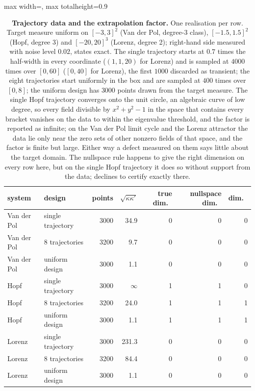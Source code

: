 \begin{table}[!htbp]
\centering\small
\begin{adjustbox}{max width=\textwidth, max totalheight=0.9\textheight}
\begin{tabular}{llrrrrr}
\toprule
system & design & points & $\sqrt{\kappa\kappa'}$ & true dim.\ & nullspace dim.\ & \symcert{} dim.\ \\
\midrule
Van der Pol & single trajectory & 3000 & 34.9 & 0 & 0 & 0 \\
Van der Pol & 8 trajectories & 3200 & 9.7 & 0 & 0 & 0 \\
Van der Pol & uniform design & 3000 & 1.1 & 0 & 0 & 0 \\
Hopf & single trajectory & 3000 & $\infty$ & 1 & 1 & 0 \\
Hopf & 8 trajectories & 3200 & 24.0 & 1 & 1 & 1 \\
Hopf & uniform design & 3000 & 1.1 & 1 & 1 & 1 \\
Lorenz & single trajectory & 3000 & 231.3 & 0 & 0 & 0 \\
Lorenz & 8 trajectories & 3200 & 84.4 & 0 & 0 & 0 \\
Lorenz & uniform design & 3000 & 1.1 & 0 & 0 & 0 \\
\bottomrule
\end{tabular}
\end{adjustbox}
\caption{\textbf{Trajectory data and the extrapolation factor.} One realisation per row. Target measure uniform on $[-3,3]^2$ (Van der Pol, degree-3 class), $[-1.5,1.5]^2$ (Hopf, degree 3) and $[-20,20]^3$ (Lorenz, degree 2); right-hand side measured with noise level $0.02$, states exact. The single trajectory starts at $0.7$ times the half-width in every coordinate ($(1,1,20)$ for Lorenz) and is sampled at $4000$ times over $[0,60]$ ($[0,40]$ for Lorenz), the first $1000$ discarded as transient; the eight trajectories start uniformly in the box and are sampled at $400$ times over $[0,8]$; the uniform design has $3000$ points drawn from the target measure. The single Hopf trajectory converges onto the unit circle, an algebraic curve of low degree, so every field divisible by $x^2 + y^2 - 1$ in the space that contains every bracket vanishes on the data to within the eigenvalue threshold, and the factor is reported as infinite; on the Van der Pol limit cycle and the Lorenz attractor the data lie only near the zero sets of other nonzero fields of that space, and the factor is finite but large. Either way a defect measured on them says little about the target domain. The nullspace rule happens to give the right dimension on every row here, but on the single Hopf trajectory it does so without support from the data; \symcert{} declines to certify exactly there.}
\label{stab:trajectory}
\end{table}
